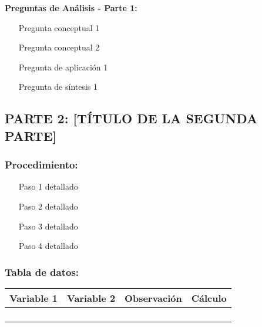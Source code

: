 \documentclass[12pt,a4paper]{article}
\begin{document}
	\begin{preguntabox}
		\textbf{Preguntas de Análisis - Parte 1:}
		\begin{enumerate}
			\item [Pregunta conceptual 1]
			
			\vspace{1.5cm}
			
			\item [Pregunta conceptual 2]
			
			\vspace{1.5cm}
			
			\item [Pregunta de aplicación 1]
			
			\vspace{1.5cm}
			
			\item [Pregunta de síntesis 1]
			
			\vspace{1.5cm}
		\end{enumerate}
	\end{preguntabox}
	
	
	\subsection{PARTE 2: [TÍTULO DE LA SEGUNDA PARTE]}
	
	\subsubsection{Procedimiento:}
	\begin{enumerate}
		\item [Paso 1 detallado]
		\item [Paso 2 detallado]
		\item [Paso 3 detallado]
		\item [Paso 4 detallado]
	\end{enumerate}
	
	\subsubsection{Tabla de datos:}
	
	\begin{center}
		\begin{tabular}{|c|c|c|c|}
			\hline
			\textbf{Variable 1} & \textbf{Variable 2} & \textbf{Observación} & \textbf{Cálculo} \\
			\hline
			& & & \\
			\hline
			& & & \\
			\hline
			& & & \\
			\hline
			& & & \\
			\hline
		\end{tabular}
	\end{center}
	
\end{document}
